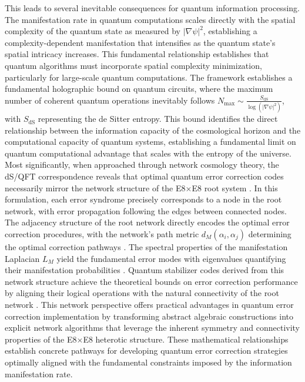 \documentclass[11pt,english,twoside]{article}
\theoremstyle{plain}
\theoremstyle{definition}
\theoremstyle{remark}
\begin{document}
This leads to several inevitable consequences for quantum information processing. The manifestation rate in quantum computations scales directly with the spatial complexity of the quantum state as measured by $|\nabla\psi|^2$, establishing a complexity-dependent manifestation that intensifies as the quantum state's spatial intricacy increases. This fundamental relationship establishes that quantum algorithms must incorporate spatial complexity minimization, particularly for large-scale quantum computations. The framework establishes a fundamental holographic bound on quantum circuits, where the maximum number of coherent quantum operations inevitably follows $N_{\text{max}} \sim \frac{S_{\text{dS}}}{\log(|\nabla\psi|^2)}$, with $S_{\text{dS}}$ representing the de Sitter entropy. This bound identifies the direct relationship between the information capacity of the cosmological horizon and the computational capacity of quantum systems, establishing a fundamental limit on quantum computational advantage that scales with the entropy of the universe. Most significantly, when approached through network cosmology theory, the dS/QFT correspondence reveals that optimal quantum error correction codes necessarily mirror the network structure of the E8$\times$E8 root system \cite{Pastawski2015,Preskill2018}. In this formulation, each error syndrome precisely corresponds to a node in the root network, with error propagation following the edges between connected nodes. The adjacency structure of the root network directly encodes the optimal error correction procedures, with the network's path metric $d_M(\alpha_i, \alpha_j)$ determining the optimal correction pathways \cite{Hartnett2020}. The spectral properties of the manifestation Laplacian $L_M$ yield the fundamental error modes with eigenvalues quantifying their manifestation probabilities \cite{Bianconi2021}. Quantum stabilizer codes derived from this network structure achieve the theoretical bounds on error correction performance by aligning their logical operations with the natural connectivity of the root network \cite{Slofstra2020}. This network perspective offers practical advantages in quantum error correction implementation by transforming abstract algebraic constructions into explicit network algorithms that leverage the inherent symmetry and connectivity properties of the E8$\times$E8 heterotic structure. These mathematical relationships establish concrete pathways for developing quantum error correction strategies optimally aligned with the fundamental constraints imposed by the information manifestation rate.
\end{document}
